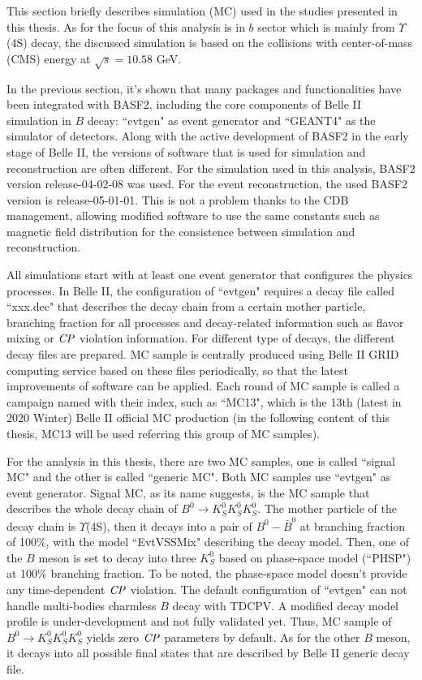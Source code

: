 This section briefly describes simulation (MC) used in the studies presented in this thesis. As for the focus of this analysis is in $b$ sector which is mainly from $\Upsilon$(4S) decay, the discussed simulation is based on the collisions with center-of-mass (CMS) energy at $\sqrt{s} = 10.58 $ GeV.

In the previous section, it's shown that many packages and functionalities have been integrated with BASF2, including the core components of Belle II simulation in $B$ decay: ``evtgen" as event generator and ``GEANT4" as the simulator of detectors. Along with the active development of BASF2 in the early stage of Belle II, the versions of software that is used for simulation and reconstruction are often different. For the simulation used in this analysis, BASF2 version release-04-02-08 was used. For the event reconstruction, the used BASF2 version is release-05-01-01. This is not a problem thanks to the CDB management, allowing modified software to use the same constants such as magnetic field distribution for the consistence between simulation and reconstruction.

 All simulations start with at least one event generator that configures the physics processes. In Belle II, the configuration of ``evtgen" requires a decay file called ``xxx.dec" that describes the decay chain from a certain mother particle, branching fraction for all processes and decay-related information such as flavor mixing or $\it{CP}$ violation information. For different type of decays, the different decay files are prepared. MC sample is centrally produced using Belle II GRID computing service based on these files periodically, so that the latest improvements of software can be applied. Each round of MC sample is called a campaign named with their index, such as ``MC13", which is the 13th (latest in 2020 Winter) Belle II official MC production (in the following content of this thesis, MC13 will be used referring this group of MC samples). 
 
 For the analysis in this thesis, there are two MC samples, one is called ``signal MC" and the other is called ``generic MC". Both MC samples use ``evtgen" as event generator. Signal MC, as its name suggests, is the MC sample that describes the whole decay chain of $B^0 \to K_S^0  K_S^0  K_S^0$. The mother particle of the decay chain is $\Upsilon$(4S), then it decays into a pair of $B^0-\bar{B}^0$ at branching fraction of 100\%, with the model ``EvtVSSMix"\cite{evtgen} describing the decay model. Then, one of the $B$ meson is set to decay into three $K_S^0$ based on phase-space model (``PHSP") at 100\% branching fraction. To be noted, the phase-space model doesn't provide any time-dependent $\it{CP}$ violation. The default configuration of ``evtgen" can not handle multi-bodies charmless $B$ decay with TDCPV. A modified decay model profile is under-development and not fully validated yet. Thus, MC sample of $B^0 \to K_S^0  K_S^0  K_S^0$ yields zero $\it{CP}$ parameters by default. As for the other $B$ meson, it decays into all possible final states that are described by Belle II generic decay file. 
 
